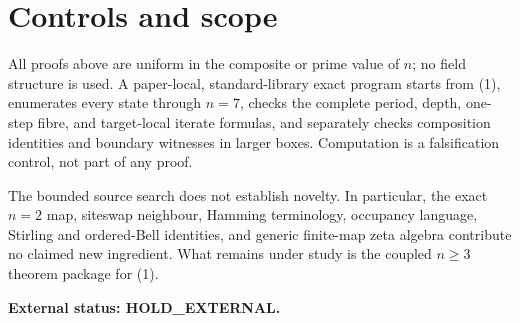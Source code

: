 \documentclass[a4paper,10pt]{amsart}
\theoremstyle{remark}
\begin{document}
\section{Controls and scope}

All proofs above are uniform in the composite or prime value of $n$; no
field structure is used.  A paper-local, standard-library exact program
starts from (1), enumerates every state through $n=7$, checks the complete
period, depth, one-step fibre, and target-local iterate formulas, and
separately checks composition identities and boundary witnesses in larger
boxes.  Computation is a falsification control, not part of any proof.

The bounded source search does not establish novelty.  In particular,
the exact $n=2$ map, siteswap neighbour, Hamming terminology, occupancy
language, Stirling and ordered-Bell identities, and generic finite-map
zeta algebra contribute no claimed new ingredient.  What remains under
study is the coupled $n\geq3$ theorem package for (1).

\medskip
\noindent\textbf{External status: HOLD\_EXTERNAL.}



\end{document}
